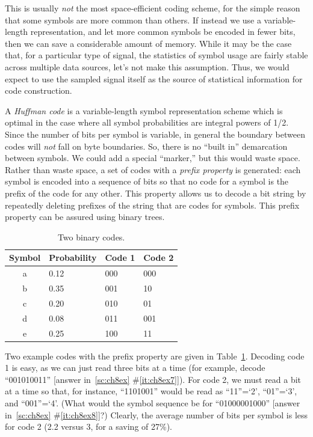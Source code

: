 This is usually \emph{not} the most space-efficient coding scheme, for
the simple reason that some symbols are more common than others.  If
instead we use a variable-length representation, and let more common
symbols be encoded in fewer bits, then we can save a considerable
amount of memory.  While it may be the case that, for a particular
type of signal, the statistics of symbol usage are fairly stable
across multiple data sources, let's not make this assumption. Thus, we
would expect to use the sampled signal itself as the source of
statistical information for code construction.

A \emph{Huffman code} is a variable-length symbol representation
scheme which is optimal in the case where all symbol probabilities are
integral powers of 1/2. Since the number of bits per symbol is
variable, in general the boundary between codes will \emph{not} fall
on byte boundaries. So, there is no ``built in'' demarcation between
symbols.  We could add a special ``marker,'' but this would waste
space.  Rather than waste space, a set of codes with a \emph{prefix
property} is generated: each symbol is encoded into a sequence of bits
so that no code for a symbol is the prefix of the code for any
other. This property allows us to decode a bit string by repeatedly
deleting prefixes of the string that are codes for symbols.  This
prefix property can be assured using binary trees.

\begin{table}[h]
\caption{Two binary codes.\label{tb:prefix}}
\begin{center}
\begin{tabular}{|c|l|l|l|}\hline
\bf Symbol & \bf Probability & \bf Code 1 & \bf Code 2 \\ \hline\hline
a & 0.12 & 000 & 000 \\
b & 0.35 & 001 & 10 \\
c & 0.20 & 010 & 01 \\
d & 0.08 & 011 & 001 \\
e & 0.25 & 100 & 11 \\ \hline
\end{tabular}
\end{center}
\end{table}

Two example codes with the prefix property are given in
Table~\ref{tb:prefix}. Decoding code 1 is easy, as we can just read
three bits at a time (for example, decode ``001010011'' [answer
in~\ref{sc:ch8ex}
\#\ref{it:ch8ex7}]).  For code 2, we must read a bit at a time so
that, for instance, ``1101001'' would be read as ``11''=`2',
``01''=`3', and ``001''=`4'. (What would the symbol sequence be for
``01000001000'' [answer in~\ref{sc:ch8ex}
\#\ref{it:ch8ex8}]?)  Clearly, the
average number of bits per symbol is less for code 2 (2.2 versus 3,
for a saving of 27\%).

